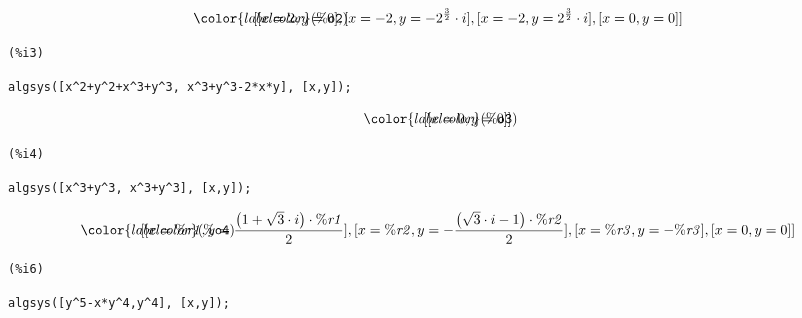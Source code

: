 \[\displaystyle
\parbox{10ex}{$\color{labelcolor}\mathrm{\tt (\%o2) }\quad $}
[[x=2,y=0],[x=-2,y=-{{2}^{\frac{3}{2}}}\cdot i],[x=-2,y={{2}^{\frac{3}{2}}}\cdot i],[x=0,y=0]]\mbox{}
\]

\noindent
\begin{minipage}[t]{8ex}\color{red}\bf
\begin{verbatim}
(%i3) 
\end{verbatim}
\end{minipage}
\begin{minipage}[t]{\textwidth}\color{blue}
\begin{verbatim}
algsys([x^2+y^2+x^3+y^3, x^3+y^3-2*x*y], [x,y]);
\end{verbatim}
\end{minipage}

\[\displaystyle
\parbox{10ex}{$\color{labelcolor}\mathrm{\tt (\%o3) }\quad $}
[[x=0,y=0]]\mbox{}
\]

\noindent
\begin{minipage}[t]{8ex}\color{red}\bf
\begin{verbatim}
(%i4) 
\end{verbatim}
\end{minipage}
\begin{minipage}[t]{\textwidth}\color{blue}
\begin{verbatim}
algsys([x^3+y^3, x^3+y^3], [x,y]);
\end{verbatim}
\end{minipage}

\[\displaystyle
\parbox{10ex}{$\color{labelcolor}\mathrm{\tt (\%o4) }\quad $}
[[x=\mathit{\%r1},y=\frac{\left( 1+\sqrt{3}\cdot i\right) \cdot \mathit{\%r1}}{2}],[x=\mathit{\%r2},y=-\frac{\left( \sqrt{3}\cdot i-1\right) \cdot \mathit{\%r2}}{2}],[x=\mathit{\%r3},y=-\mathit{\%r3}],[x=0,y=0]]\mbox{}
\]

\noindent
\begin{minipage}[t]{8ex}\color{red}\bf
\begin{verbatim}
(%i6) 
\end{verbatim}
\end{minipage}
\begin{minipage}[t]{\textwidth}\color{blue}
\begin{verbatim}
algsys([y^5-x*y^4,y^4], [x,y]);
\end{verbatim}
\end{minipage}

